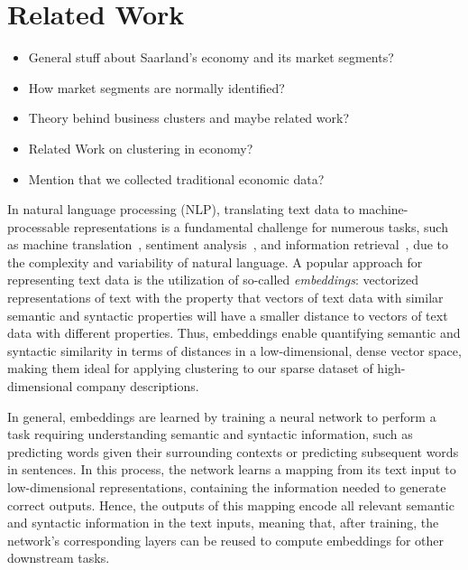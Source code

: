 \documentclass[conference]{IEEEtran}
\begin{document}
\section{Related Work}
\color{red}
\begin{itemize}
    \item General stuff about Saarland's economy and its market segments?
    \item How market segments are normally identified?
    \item Theory behind business clusters and maybe related work?
    \item Related Work on clustering in economy?
    \item Mention that we collected traditional economic data?
\end{itemize}
\color{black}


In natural language processing (NLP), translating text data to machine-processable representations is a fundamental challenge for numerous tasks, such as machine translation~\cite{qi2018and}, sentiment analysis~\cite{rezaeinia2019sentiment}, and information retrieval~\cite{ye2016word}, due to the complexity and variability of natural language. A popular approach for representing text data is the utilization of so-called \emph{embeddings}: vectorized representations of text with the property that vectors of text data with similar semantic and syntactic properties will have a smaller distance to vectors of text data with different properties. Thus, embeddings enable quantifying semantic and syntactic similarity in terms of distances in a low-dimensional, dense vector space, making them ideal for applying clustering to our sparse dataset of high-dimensional company descriptions.  

In general, embeddings are learned by training a neural network to perform a task requiring understanding semantic and syntactic information, such as predicting words given their surrounding contexts or predicting subsequent words in sentences. In this process, the network learns a mapping from its text input to low-dimensional representations, containing the information needed to generate correct outputs. Hence, the outputs of this mapping encode all relevant semantic and syntactic information in the text inputs, meaning that, after training, the network's corresponding layers can be reused to compute embeddings for other downstream tasks.
\end{document}

